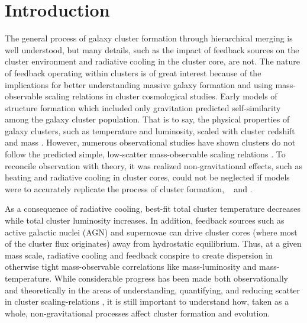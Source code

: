 \section{Introduction}
\label{sec:entsuppintro}

The general process of galaxy cluster formation through hierarchical
merging is well understood, but many details, such as the impact of
feedback sources on the cluster environment and radiative cooling in
the cluster core, are not. The nature of feedback operating within
clusters is of great interest because of the implications for better
understanding massive galaxy formation and using mass-observable
scaling relations in cluster cosmological studies. Early models of
structure formation which included only gravitation predicted
self-similarity among the galaxy cluster population. That is to say,
the physical properties of galaxy clusters, such as temperature and
luminosity, scaled with cluster redshift and mass \citep{kaiser86,
  1991ApJ...383...95E, nfw1, nfw2, 1996ApJ...469..494E,
  1997MNRAS.292..289E, 1997ApJ...480...36T, 1998ApJ...503..569E,
  1998ApJ...495...80B}. However, numerous observational studies have
shown clusters do not follow the predicted simple, low-scatter
mass-observable scaling relations \citep{edge91, 1998MNRAS.297L..57A,
  1998ApJ...504...27M, 1999MNRAS.305..631A, 1999ApJ...520...78H,
  2000ApJ...536...73N, 2001A&A...368..749F}. To reconcile observation
with theory, it was realized non-gravitational effects, such as
heating and radiative cooling in cluster cores, could not be neglected
if models were to accurately replicate the process of cluster
formation, \eg\ \citet{2000ApJ...532...17L} and
\citet{2002MNRAS.336..409B}.

As a consequence of radiative cooling, best-fit total cluster
temperature decreases while total cluster luminosity increases. In
addition, feedback sources such as active galactic nuclei (AGN) and
supernovae can drive cluster cores (where most of the cluster flux
originates) away from hydrostatic equilibrium. Thus, at a given mass
scale, radiative cooling and feedback conspire to create dispersion in
otherwise tight mass-observable correlations like mass-luminosity and
mass-temperature. While considerable progress has been made both
observationally and theoretically in the areas of understanding,
quantifying, and reducing scatter in cluster scaling-relations
\citep[eg][]{1996ApJ...458...27B, 2005ApJ...624..606J, kravtsov06,
  nagai07, VV08}, it is still important to understand how, taken as a
whole, non-gravitational processes affect cluster formation and
evolution.

